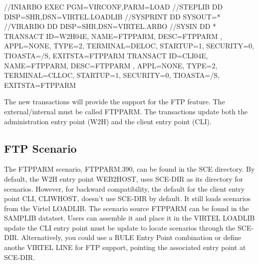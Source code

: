 \documentclass[letterpaper,10pt,english]{sphinxmanual}
\begin{document}
\begin{sphinxVerbatim}[commandchars=\\\{\}]
//INIARBO EXEC PGM=VIRCONF,PARM=LOAD
//STEPLIB  DD  DISP=SHR,DSN=VIRTEL.LOADLIB
//SYSPRINT DD  SYSOUT=*
//VIRARBO  DD  DISP=SHR,DSN=VIRTEL.ARBO
//SYSIN    DD  *
    TRANSACT ID=W2H\PYGZhy{}04E,                                             \PYGZhy{}
            NAME=FTPPARM,                                           \PYGZhy{}
            DESC=\PYGZsq{}FTPPARM   \PYGZsq{},                                      \PYGZhy{}
            APPL=\PYGZdl{}NONE\PYGZdl{},                                            \PYGZhy{}
            TYPE=2,                                                 \PYGZhy{}
            TERMINAL=DELOC,                                         \PYGZhy{}
            STARTUP=1,                                              \PYGZhy{}
            SECURITY=0,                                             \PYGZhy{}
            TIOASTA=\PYGZam{}/S,                                            \PYGZhy{}
            EXITSTA=FTPPARM
    TRANSACT ID=CLI\PYGZhy{}04E,                                             \PYGZhy{}
            NAME=FTPPARM,                                           \PYGZhy{}
            DESC=\PYGZsq{}FTPPARM   \PYGZsq{},                                      \PYGZhy{}
            APPL=\PYGZdl{}NONE\PYGZdl{},                                            \PYGZhy{}
            TYPE=2,                                                 \PYGZhy{}
            TERMINAL=CLLOC,                                         \PYGZhy{}
            STARTUP=1,                                              \PYGZhy{}
            SECURITY=0,                                             \PYGZhy{}
            TIOASTA=\PYGZam{}/S,                                            \PYGZhy{}
            EXITSTA=FTPPARM
\end{sphinxVerbatim}

The new transactions will provide the support for the FTP feature. The external/internal must be called FTPPARM. The transactions update both the administration entry point (W2H) and the client entry point (CLI).




\subsection{FTP Scenario}
\label{\detokenize{Customization:ftp-scenario}}
The FTPPARM scenario, FTPPARM.390, can be found in the SCE directory. By default, the W2H entry point WEB2HOST, uses SCE-DIR as its directory for scenarios. However, for backward compatibility, the default for the client entry point CLI, CLIWHOST, doesn’t use SCE-DIR by default. It still loads scenarios from the Virtel LOADLIB. The scenario source FTPPARM can be found in the SAMPLIB datatset. Users can assemble it and place it in the VIRTEL LOADLIB  update the CLI entry point must be update to locate scenarios through the SCE-DIR. Alternatively, you could use a RULE \textbar{} Entry Point combination or define anothe VIRTEL LINE for FTP support, pointing the associated entry point at SCE-DIR.
\end{document}
